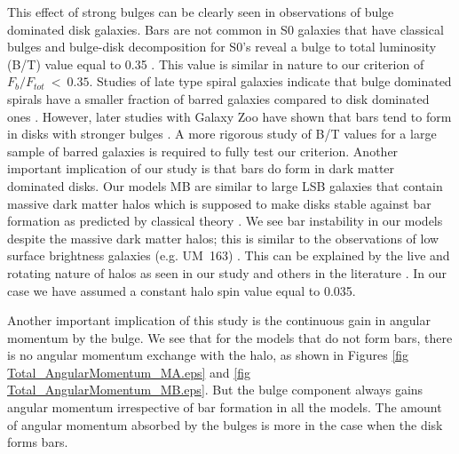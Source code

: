 \documentclass[a4paper,fleqn,usenatbib,useAMS]{mnras}
\begin{document}
This effect of strong bulges can be clearly seen in observations of bulge dominated disk galaxies. Bars are not common in S0 galaxies that have classical bulges and bulge-disk decomposition for S0's reveal a bulge to total luminosity (B/T) value equal to 0.35 \citep{57}. This value is similar in nature to our criterion of $F_{b}/F_{tot}~<~0.35$. Studies of late type spiral galaxies indicate that bulge dominated spirals have a smaller fraction of barred galaxies compared to disk 
dominated ones \citep{2}. However, later studies with Galaxy Zoo have shown that bars tend to form in disks with stronger bulges \citep{4}. A more rigorous study of B/T values for a large sample of barred galaxies is required to fully test our criterion.
Another important implication of our study is that bars do form in dark matter dominated disks. Our models MB are similar to large LSB galaxies that contain massive dark matter halos which is supposed to make disks stable against bar formation as predicted by classical theory   \citep{12a,24}. We see bar instability in our models despite the massive dark matter halos; this is similar to the observations of low surface brightness galaxies (e.g. UM~163) \citep{26}. This can be explained by the live and rotating nature of halos as seen in our study and others in the literature \citep{17,18}. In our case we have assumed a constant halo spin value equal to 0.035.     
 
Another important implication of this study is the continuous gain in angular momentum by the bulge. We see that for the models that do not form bars, there is no angular momentum exchange with the halo, as shown in Figures \ref{fig Total_AngularMomentum_MA.eps} and \ref{fig Total_AngularMomentum_MB.eps}. But the bulge component always
gains angular momentum irrespective of bar formation in all the
models. The amount of angular momentum absorbed by the bulges is
more in the case when the disk forms bars.
\end{document}
